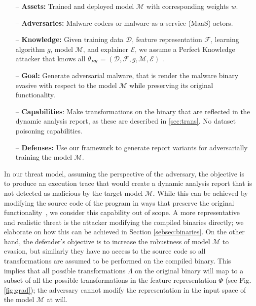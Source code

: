 \begin{itemize}
    \item[--] \textbf{Assets:} Trained and deployed model $\mathcal{M}$ with corresponding weights ${w}$.
    \item[--] \textbf{Adversaries:} Malware coders or malware-as-a-service (MaaS) actors.
    \item[--] \textbf{Knowledge:} Given training data $\mathcal{D}$, feature representation $\mathcal{F}$, learning algorithm $g$, model $\mathcal{M}$, and explainer $\mathcal{E}$, we assume a Perfect Knowledge attacker that knows all $\theta_{PK} = (\mathcal{D},\mathcal{F},g,\mathcal{M}, \mathcal{E})$ \cite{biggio2018wild}.
    \item[--] \textbf{Goal:} Generate adversarial malware, that is render the malware binary evasive with respect to the model $\mathcal{M}$ while preserving its original functionality.
    \item[--] \textbf{Capabilities}: Make transformations on the binary that are reflected in the dynamic analysis report, as these are described in \autoref{sec:trans}. No dataset poisoning capabilities.
    \item[--] \textbf{Defenses:} Use our framework to generate report variants for adversarially training the model $\mathcal{M}$.
\end{itemize}

In our threat model, assuming the perspective of the adversary, the objective is to produce an execution trace that would create a dynamic analysis report that is not detected as malicious by the target model $\mathcal{M}$.
While this can be achieved by modifying the source code of the program in ways that preserve the original functionality~\cite{ming2017impeding}, we consider this capability out of scope.
A more representative and realistic threat is the attacker modifying the compiled binaries directly; we elaborate on how this can be achieved in Section \ref{sebsec:binaries}.
On the other hand, the defender's objective is to increase the robustness of model $\mathcal{M}$ to evasion, but similarly they have no access to the source code so all transformations are assumed to be performed on the compiled binary.
This implies that all possible transformations $\Lambda$ on the original binary will map to a subset of all the possible transformations in the feature representation $\Phi$ (see Fig. \ref{fig:grad}); the adversary cannot modify the representation in the input space of the model $\mathcal{M}$ at will.

